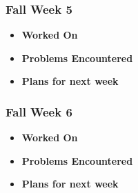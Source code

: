 \documentclass[compsoc,draftclsnofoot,onecolumn,10pt]{IEEEtran}
\begin{document}
\subsubsection{Fall Week 5}
\begin{itemize}
    \item {\textbf{Worked On}}
    \begin{itemize}
        
    \end{itemize}

    \item {\textbf{Problems Encountered}}
    \begin{itemize}
        
    \end{itemize}

    \item{\textbf{Plans for next week}}
    \begin{itemize}
        
    \end{itemize}

\end{itemize}

\subsubsection{Fall Week 6}
\begin{itemize}
    \item {\textbf{Worked On}}
    \begin{itemize}
        
    \end{itemize}

    \item {\textbf{Problems Encountered}}
    \begin{itemize}
        
    \end{itemize}

    \item{\textbf{Plans for next week}}
    \begin{itemize}
        
    \end{itemize}

\end{itemize}
\end{document}
